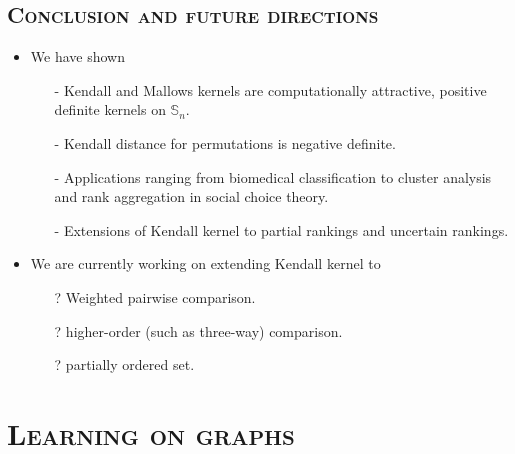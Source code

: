\documentclass[xcolor=x11names,compress]{beamer}
\theoremstyle{plain}
\renewcommand{\(}{\begin{columns}}
\renewcommand{\)}{\end{columns}}
\newcommand{\<}[1]{\begin{column}{#1}}
\renewcommand{\>}{\end{column}}
\newcommand{\Sn}{\mathbb{S}_n}
\begin{document}
\subsection{\scshape Conclusion and future directions}
\begin{frame}{\insertsubsection}
	
	\begin{itemize}
		\item We have shown
		\begin{itemize}
		 \item[-] Kendall and Mallows kernels are computationally attractive, positive definite kernels on $\Sn$.
		 \item[-] Kendall distance for permutations is negative definite.
		 \pause
		 \item[-] Applications ranging from biomedical classification to cluster analysis and rank aggregation in social choice theory.
		 \pause
		 \item[-] Extensions of Kendall kernel to partial rankings and uncertain rankings.
		\end{itemize}
		
		\pause
		
		\item We are currently working on extending Kendall kernel to
		\begin{itemize}
			\item[?] Weighted pairwise comparison.
			\item[?] higher-order (such as three-way) comparison.
			\item[?] partially ordered set.
		\end{itemize}
	\end{itemize}
	
\end{frame}

\section{\scshape Learning on graphs}
\end{document}
